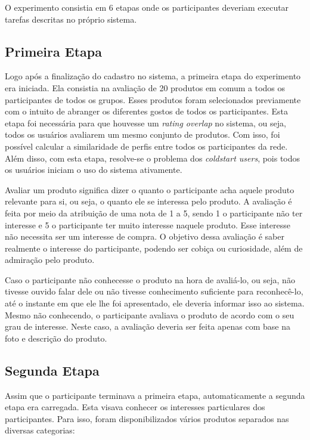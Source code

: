  O experimento consistia em 6 etapas onde os participantes deveriam executar tarefas descritas no próprio sistema.
 
\subsection{Primeira Etapa}
\label{cha:primeira_etapa}

 Logo após a finalização do cadastro no sistema, a primeira etapa do experimento era iniciada. Ela consistia na avaliação de 20 produtos em comum a todos os participantes de todos os grupos. Esses produtos foram selecionados previamente com o intuito de abranger os diferentes gostos de todos os participantes. Esta etapa foi necessária para que houvesse um \textit{rating overlap} no sistema, ou seja, todos os usuários avaliarem um mesmo conjunto de produtos. Com isso, foi possível calcular a similaridade de perfis entre todos os participantes da rede. Além disso, com esta etapa, resolve-se o problema dos \textit{coldstart users}, pois todos os usuários iniciam o uso do sistema ativamente.

 Avaliar um produto significa dizer o quanto o participante acha aquele produto relevante para si, ou seja, o quanto ele se interessa pelo produto. A avaliação é feita por meio da atribuição de uma nota de 1 a 5, sendo 1 o participante não ter interesse e 5 o participante ter muito interesse naquele produto. Esse interesse não necessita ser um interesse de compra. O objetivo dessa avaliação é saber realmente o interesse do participante, podendo ser cobiça ou curiosidade, além de admiração pelo produto.

 
 Caso o participante não conhecesse o produto na hora de avaliá-lo, ou seja, não tivesse ouvido falar dele ou não tivesse conhecimento suficiente para reconhecê-lo, até o instante em que ele lhe foi apresentado, ele deveria informar isso ao sistema. Mesmo não conhecendo, o participante avaliava o produto de acordo com o seu grau de interesse. Neste caso, a avaliação deveria ser feita apenas com base na foto e descrição do produto.
 
\subsection{Segunda Etapa}
\label{cha:segunda_etapa}

 Assim que o participante terminava a primeira etapa, automaticamente a segunda etapa era carregada. Esta visava conhecer os interesses particulares dos participantes. Para isso, foram disponibilizados vários produtos separados nas diversas categorias:

